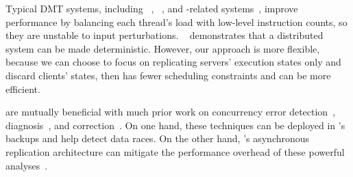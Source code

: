 Typical DMT systems, including \kendo~\cite{kendo:asplos09}, 
\coredet~\cite{coredet:asplos10}, and \coredet-related 
systems~\cite{dos:osdi10, ddos:asplos13}, improve performance by balancing each 
thread's load with low-level instruction counts, so they are unstable to 
input perturbations. \ddos~\cite{ddos:asplos13} demonstrates that a distributed 
system can be made deterministic. However, our \xxx approach is more flexible, 
because we can choose to focus on replicating servers' execution states only 
and discard clients' states, then \xxx has fewer scheduling constraints and can 
be more efficient.



% 

 \xxx are mutually beneficial with much prior work on 
concurrency error 
detection~\cite{yu:racetrack:sosp,savage:eraser,racerx:sosp03,lu:muvi:sosp,
avio:asplos06,conmem:asplos10},
diagnosis~\cite{racefuzzer:pldi08,ctrigger:asplos09,atomfuzzer:fse08}, and
correction~\cite{dimmunix:osdi08,gadara:osdi08,wu:loom:osdi10,cfix:osdi12}. 
On one hand, these techniques can be deployed in \xxx's backups and help 
\xxx detect data races. On the other hand, \xxx's asynchronous replication 
architecture can mitigate the performance overhead of these powerful 
analyses~\cite{repframe:apsys15}.

% 
